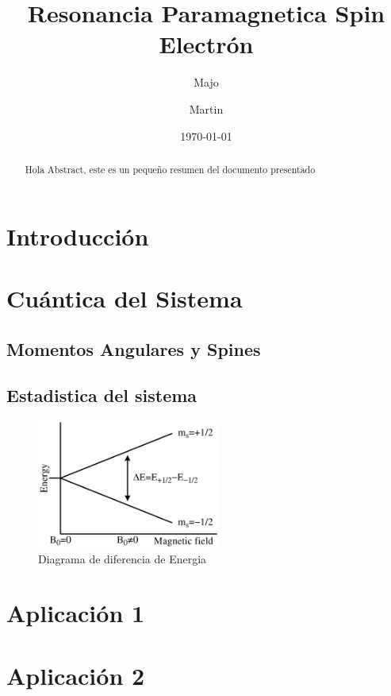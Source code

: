 \documentclass[twocolumn,amssymb,prb,aps,superscriptaddress]{revtex4}
\begin{document}
\begin{abstract}
    Hola Abstract, este es un pequeño resumen del documento presentado
\end{abstract}

\title{Resonancia Paramagnetica Spin Electrón}
\author{Majo}


\author{Martin}


\date{\today}

\maketitle

\section[Intro]{Introducción}
\label{sec:intro}

\section[]{Cuántica del Sistema}
\label{sec:cuantica}

\subsection*{Momentos Angulares y Spines}
\label{sec:momentosAngulares}

\subsection*{Estadistica del sistema}
\label{mecanicaEstadistica}

    \begin{figure}[H]
        \centering
        \includegraphics*[width=6.0cm]{Images/EPR_splitting}
        \caption{Diagrama de diferencia de Energia}
        \label{fig:diagramaDiferenciaDeEnergia} 
    \end{figure}

\section[]{Aplicación 1}
\label{sec:aplicacion1}

\section[]{Aplicación 2}
\label{sec:aplicacion2}
\end{document}
